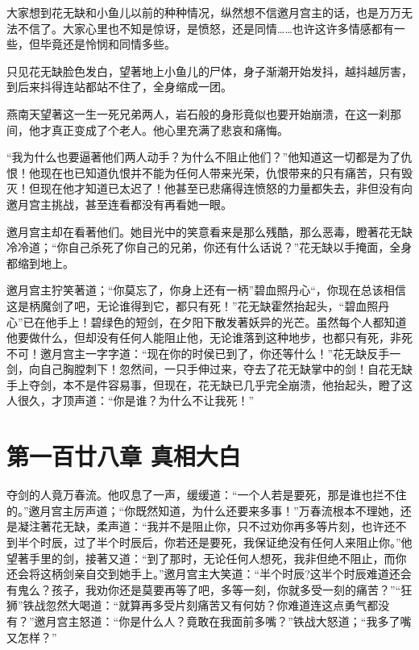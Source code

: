 \documentclass[12pt,oneside]{book}
\begin{document}
大家想到花无缺和小鱼儿以前的种种情况，纵然想不信邀月宫主的话，也是万万无法不信了。大家心里也不知是惊讶，是愤怒，还是同情\ldots\ldots 也许这许多情感都有一些，但毕竟还是怜悯和同情多些。

只见花无缺脸色发白，望著地上小鱼儿的尸体，身子渐潮开始发抖，越抖越厉害，到后来抖得连站都站不住了，全身缩成一团。

燕南天望著这一生一死兄弟两人，岩石般的身形竟似也要开始崩溃，在这一刹那间，他才真正变成了个老人。他心里充满了悲哀和痛悔。

``我为什么也要逼著他们两人动手？为什么不阻止他们？''他知道这一切都是为了仇恨！他现在也已知道仇恨并不能为任何人带来光荣，仇恨带来的只有痛苦，只有毁灭！但现在他才知道已太迟了！他甚至已悲痛得连愤怒的力量都失去，非但没有向邀月宫主挑战，甚至连看都没有再看她一眼。

邀月宫主却在看著他们。她目光中的笑意看来是那么残酷，那么恶毒，瞪著花无缺冷冷道；``你自己杀死了你自己的兄弟，你还有什么话说？''花无缺以手掩面，全身都缩到地上。

邀月宫主狞笑著道；``你莫忘了，你身上还有一柄''碧血照丹心``，你现在总该相信这是柄魔剑了吧，无论谁得到它，都只有死！''花无缺霍然抬起头，``碧血照丹心''已在他手上！碧绿色的短剑，在夕阳下散发著妖异的光芒。虽然每个人都知道他要做什么，但却没有任何人能阻止他，无论谁落到这种地步，也都只有死，非死不可！邀月宫主一字字道：``现在你的时侯已到了，你还等什么！''花无缺反手一剑，向自己胸膛刺下！忽然间，一只手伸过来，夺去了花无缺掌中的剑！自花无缺手上夺剑，本不是件容易事，但现在，花无缺已几乎完全崩溃，他抬起头，瞪了这人很久，才顶声道：``你是谁？为什么不让我死！''

\hypertarget{ux7b2cux4e00ux767eux5effux516bux7ae0-ux771fux76f8ux5927ux767d}{%
\chapter{第一百廿八章
真相大白}\label{ux7b2cux4e00ux767eux5effux516bux7ae0-ux771fux76f8ux5927ux767d}}

夺剑的人竟万春流。他叹息了一声，缓缓道：``一个人若是要死，那是谁也拦不住的。''邀月宫主厉声道；``你既然知道，为什么还要来多事！''万春流根本不理她，还是凝注著花无缺，柔声道：``我并不是阻止你，只不过劝你再多等片刻，也许还不到半个时辰，过了半个时辰后，你若还是要死，我保证绝没有任何人来阻止你。''他望著手里的剑，接著又道：``到了那时，无论任何人想死，我非但绝不阻止，而你还会将这柄剑亲自交到她手上。''邀月宫主大笑道：``半个时辰?这半个时辰难道还会有鬼么？孩子，我劝你还是莫要再等了吧，多等一刻，你就多受一刻的痛苦？''``狂狮''铁战忽然大喝道：``就算再多受片刻痛苦又有何妨？你难道连这点勇气都没有？''邀月宫主怒道：``你是什么人？竟敢在我面前多嘴？''铁战大怒道；``我多了嘴又怎样？''
\end{document}
